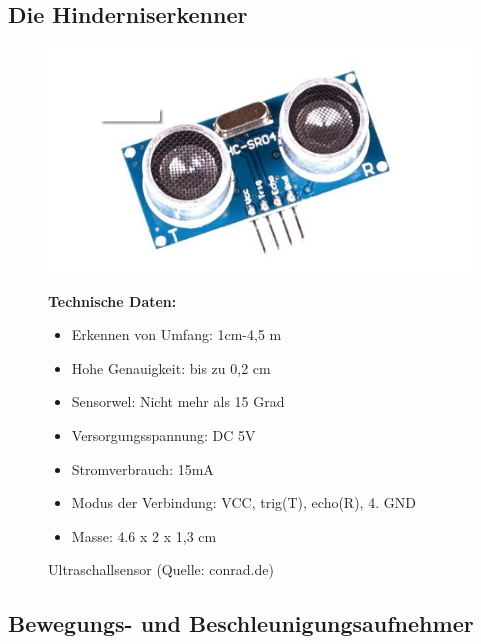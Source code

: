 \subsection{Die Hinderniserkenner}
\begin{figure}[htb]
	\centering
	\begin{minipage}{0.49\linewidth}
	\includegraphics[scale=0.49]{images/Bild-1-1.png}
	\caption{Ultraschallsensor \newline(Quelle: conrad.de)}
\end{minipage}
\begin{minipage}{0.49\linewidth}
\textbf{Technische Daten:} 
\begin{itemize} 
			\item 	Erkennen von Umfang: 1cm-4,5 m 
			\item 	Hohe Genauigkeit: bis zu 0,2 cm
			\item 	Sensorwel: Nicht mehr als 15 Grad
			\item 	Versorgungsspannung: DC 5V
			\item Stromverbrauch: 15mA		
			\item Modus der Verbindung: VCC, trig(T), echo(R), 4. GND		
			\item Masse: 4.6 x 2 x 1,3 cm
\end{itemize}
\end{minipage}
\end{figure}

\subsection{Bewegungs- und Beschleunigungsaufnehmer}

